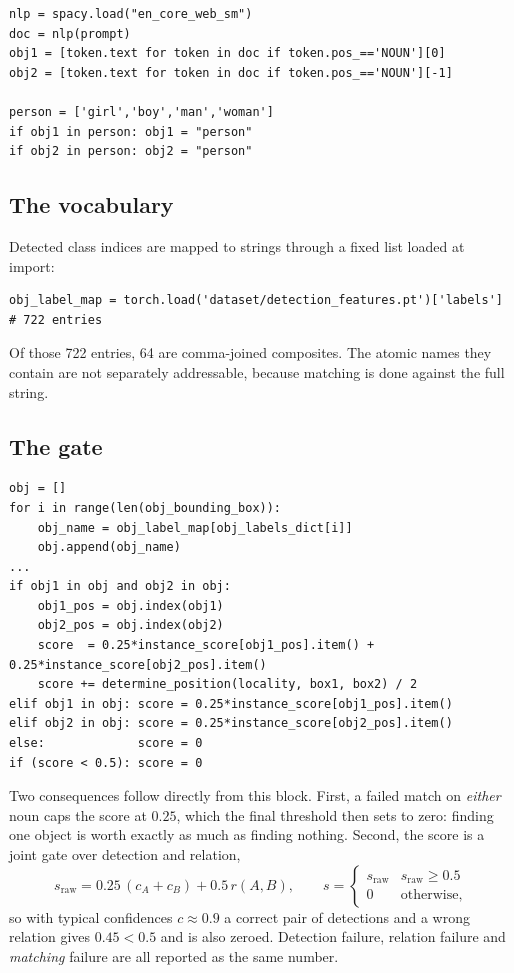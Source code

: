 \documentclass[11pt,a4paper]{article}
\newcommand{\code}[1]{\texttt{\small #1}}
\begin{document}
\begin{lstlisting}[caption={\code{UniDet\_eval/2D\_spatial\_eval.py}, simple-structure branch.}]
nlp = spacy.load("en_core_web_sm")
doc = nlp(prompt)
obj1 = [token.text for token in doc if token.pos_=='NOUN'][0]
obj2 = [token.text for token in doc if token.pos_=='NOUN'][-1]

person = ['girl','boy','man','woman']
if obj1 in person: obj1 = "person"
if obj2 in person: obj2 = "person"
\end{lstlisting}

\subsection{The vocabulary}
Detected class indices are mapped to strings through a fixed list loaded at import:

\begin{lstlisting}
obj_label_map = torch.load('dataset/detection_features.pt')['labels']   # 722 entries
\end{lstlisting}

Of those 722 entries, 64 are comma-joined composites. The atomic names they contain are not
separately addressable, because matching is done against the full string.

\subsection{The gate}
\begin{lstlisting}[caption={The defect. \code{obj} is a \emph{list} of label strings, so \code{in} is
list membership, i.e.\ exact string equality --- not substring containment.}]
obj = []
for i in range(len(obj_bounding_box)):
    obj_name = obj_label_map[obj_labels_dict[i]]
    obj.append(obj_name)
...
if obj1 in obj and obj2 in obj:
    obj1_pos = obj.index(obj1)
    obj2_pos = obj.index(obj2)
    score  = 0.25*instance_score[obj1_pos].item() + 0.25*instance_score[obj2_pos].item()
    score += determine_position(locality, box1, box2) / 2
elif obj1 in obj: score = 0.25*instance_score[obj1_pos].item()
elif obj2 in obj: score = 0.25*instance_score[obj2_pos].item()
else:             score = 0
if (score < 0.5): score = 0
\end{lstlisting}

Two consequences follow directly from this block. First, a failed match on \emph{either} noun caps
the score at $0.25$, which the final threshold then sets to zero: finding one object is worth exactly
as much as finding nothing. Second, the score is a joint gate over detection and relation,
\[
s_{\text{raw}}=0.25\,(c_A+c_B)+0.5\,r(A,B),\qquad
s=\begin{cases} s_{\text{raw}} & s_{\text{raw}}\ge 0.5\\ 0 & \text{otherwise,}\end{cases}
\]
so with typical confidences $c\!\approx\!0.9$ a correct pair of detections and a wrong relation gives
$0.45<0.5$ and is also zeroed. Detection failure, relation failure and \emph{matching} failure are
all reported as the same number.
\end{document}
